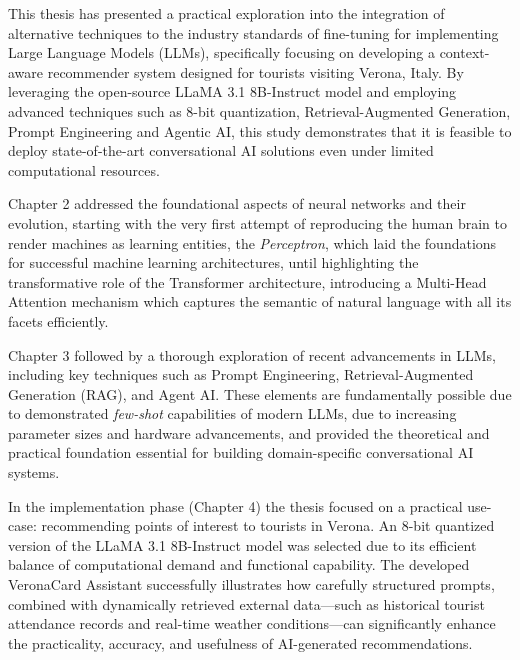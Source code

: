 This thesis has presented a practical exploration into the integration of alternative techniques to the industry standards of fine-tuning for implementing Large Language Models (LLMs), specifically focusing on developing a context-aware recommender system designed for tourists visiting Verona, Italy. By leveraging the open-source LLaMA 3.1 8B-Instruct model and employing advanced techniques such as 8-bit quantization, Retrieval-Augmented Generation, Prompt Engineering and Agentic AI, this study demonstrates that it is feasible to deploy state-of-the-art conversational AI solutions even under limited computational resources.

Chapter 2 addressed the foundational aspects of neural networks and their evolution, starting with the very first attempt of reproducing the human brain to render machines as learning entities, the \textit{Perceptron}, which laid the foundations for successful machine learning architectures, until highlighting the transformative role of the Transformer architecture, introducing a Multi-Head Attention mechanism which captures the semantic of natural language with all its facets efficiently.

Chapter 3 followed by a thorough exploration of recent advancements in LLMs, including key techniques such as Prompt Engineering, Retrieval-Augmented Generation (RAG), and Agent AI. These elements are fundamentally possible due to demonstrated \textit{few-shot} capabilities of modern LLMs, due to increasing parameter sizes and hardware advancements, and provided the theoretical and practical foundation essential for building domain-specific conversational AI systems.

In the implementation phase (Chapter 4) the thesis focused on a practical use-case: recommending points of interest to tourists in Verona. An 8-bit quantized version of the LLaMA 3.1 8B-Instruct model was selected due to its efficient balance of computational demand and functional capability. The developed VeronaCard Assistant successfully illustrates how carefully structured prompts, combined with dynamically retrieved external data—such as historical tourist attendance records and real-time weather conditions—can significantly enhance the practicality, accuracy, and usefulness of AI-generated recommendations.

